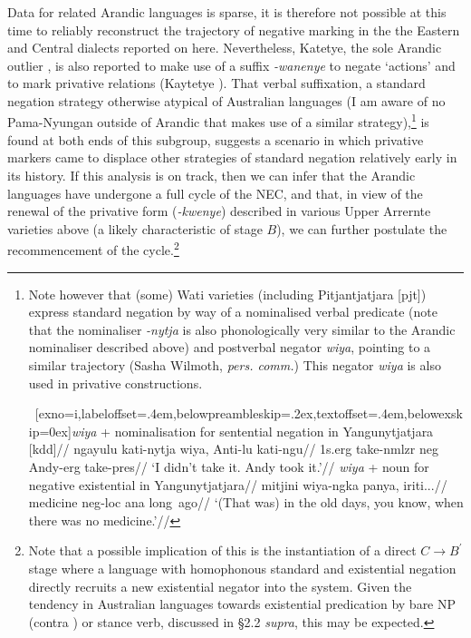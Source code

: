 \documentclass[usenames,dvipsnames,11pt]{article}
\begin{document}
{Data for related Arandic languages is sparse, it is therefore not possible at this time to reliably reconstruct the trajectory of negative marking in the the Eastern and Central dialects reported on here. Nevertheless, Katetye, the sole Arandic outlier \citep[see][]{Hale1962,Koch2004}, is also reported to make use of a suffix \textit{-wanenye} to negate `actions' and to mark privative relations (Kaytetye \citeyear[826]{KaytetyeDict}). That verbal suffixation, a standard negation strategy otherwise atypical of Australian languages (I am aware of no Pama-Nyungan outside of Arandic that makes use of a similar strategy),\footnote{Note however that (some) Wati varieties (including Pitjantjatjara [\gls{pjt}]) express standard negation by way of a nominalised verbal predicate (note that the nominaliser \textit{-nytja} is also phonologically very similar to the Arandic nominaliser described above) and postverbal negator \textit{wiya}, pointing to a similar trajectory (Sasha Wilmoth, \textit{pers. comm.}) This negator \textit{wiya} is also used in privative constructions. 


\pex~[exno=i,labeloffset=.4em,belowpreambleskip=.2ex,textoffset=.4em,belowexskip=0ex]\a\begingl\glpreamble \textit{wiya} + nominalisation for sentential negation in Yangunytjatjara [\gls{kdd}]//
\gla ngayulu kati-nytja wiya, Anti-lu kati-ngu//
\glb 1s.\gls{erg} take-\gls{nmlzr} \gls{neg} Andy-\gls{erg} take-\gls{pres}//
\glft`I didn't take it. Andy took it.'//\endgl
\a\begingl\glpreamble \textit{wiya} + noun for negative existential in Yangunytjatjara//
\gla mitjini wiya-ngka panya, iriti...//
\glb medicine \gls{neg}-\gls{loc} \gls{ana} long~ago//
\glft`(That was) in the old days, you know, when there was no medicine.'//\endgl \xe

} is found at both ends of this subgroup, suggests a scenario in which privative markers came to displace other strategies of standard negation relatively early in its history. If this analysis is on track, then we can infer that the Arandic languages have undergone a full cycle of the NEC, and that, in view of the renewal of the privative form (\textit{-kwenye}) described in various Upper Arrernte varieties above (a likely characteristic of stage $B$), we can further postulate the recommencement of the cycle.\footnote{Note that a possible implication of this is the instantiation of a direct $C\to B^\prime$ stage where a language with homophonous standard and existential negation directly recruits a new existential negator into the system. Given the tendency in Australian languages towards existential predication by bare NP (contra \citealt{Croft1991}) or stance verb, discussed in §2.2 \textit{supra}, this may be expected.
	
}}
\end{document}
